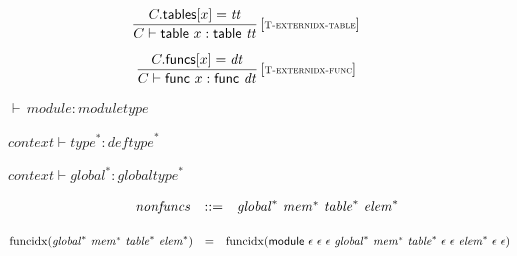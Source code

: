 $$
\begin{array}{@{}c@{}}\displaystyle
\frac{
C{.}\mathsf{tables}{}[x] = {\mathit{tt}}
}{
C \vdash \mathsf{table}~x : \mathsf{table}~{\mathit{tt}}
} \, {[\textsc{\scriptsize T{-}externidx{-}table}]}
\qquad
\end{array}
$$

$$
\begin{array}{@{}c@{}}\displaystyle
\frac{
C{.}\mathsf{funcs}{}[x] = {\mathit{dt}}
}{
C \vdash \mathsf{func}~x : \mathsf{func}~{\mathit{dt}}
} \, {[\textsc{\scriptsize T{-}externidx{-}func}]}
\qquad
\end{array}
$$

\vspace{1ex}

$\boxed{{\vdash}\, {\mathit{module}} : {\mathit{moduletype}}}$

$\boxed{{\mathit{context}} \vdash {{\mathit{type}}^\ast} : {{\mathit{deftype}}^\ast}}$

$\boxed{{\mathit{context}} \vdash {{\mathit{global}}^\ast} : {{\mathit{globaltype}}^\ast}}$

$$
\begin{array}[t]{@{}lrrl@{}l@{}}
& {\mathit{nonfuncs}} & ::= & {{\mathit{global}}^\ast}~{{\mathit{mem}}^\ast}~{{\mathit{table}}^\ast}~{{\mathit{elem}}^\ast} \\
\end{array}
$$

$$
\begin{array}[t]{@{}lcl@{}l@{}}
{\mathrm{funcidx}}({{\mathit{global}}^\ast}~{{\mathit{mem}}^\ast}~{{\mathit{table}}^\ast}~{{\mathit{elem}}^\ast}) & = & {\mathrm{funcidx}}(\mathsf{module}~\epsilon~\epsilon~\epsilon~{{\mathit{global}}^\ast}~{{\mathit{mem}}^\ast}~{{\mathit{table}}^\ast}~\epsilon~\epsilon~{{\mathit{elem}}^\ast}~\epsilon~\epsilon) \\
\end{array}
$$

